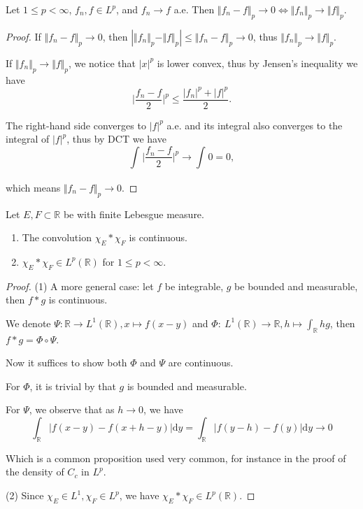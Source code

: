 \begin{problem}
Let $ 1\le p<\infty $, $ f_{n},f\in L^{p} $, and $ f_{n}\to f $ a.e. Then $ \Vert f_{n}-f \Vert_{p}\to 0 \Leftrightarrow \Vert f_{n} \Vert_{p}\to \Vert f \Vert_{p} $.
\end{problem}

\begin{proof}
	If $ \Vert f_{n}-f \Vert_{p}\to 0 $, then $ |\Vert f_{n} \Vert_{p}-\Vert f \Vert_{p}|\le \Vert f_{n}-f \Vert_{p}\to 0 $, thus $ \Vert f_{n} \Vert_{p}\to \Vert f \Vert_{p} $.
	
	If $ \Vert f_{n} \Vert_{p}\to \Vert f \Vert_{p} $, we notice that $ |x|^{p} $ is lower convex, thus by Jensen's inequality we have
	$$
	\Big|\frac{f_n-f}{2}\Big|^p\le \frac{|f_n|^p+|f|^p}{2}.
	$$
	
	The right-hand side converges to $ |f|^{p} $ a.e. and its integral also converges to the integral of $ |f|^{p} $, thus by DCT we have
	$$
	\int_{}^{}{\Big|\frac{f_n-f}{2}\Big|^p}\rightarrow \int_{}^{}{0}=0,
	$$
	
	which means $ \Vert f_{n}-f \Vert_{p}\to 0 $.
\end{proof}

\begin{problem}
Let $ E,F\subset \mathbb{R}  $ be with finite Lebesgue measure.
\begin{enumerate}
\item The convolution $ \chi _{E}*\chi _{F} $ is continuous.
\item $ \chi _{E}*\chi _{F}\in L^{p}(\mathbb{R} ) $ for $ 1\le p<\infty $.
\end{enumerate}
\end{problem}

\begin{proof}
	(1) A more general case: let $ f $ be integrable, $ g $ be bounded and measurable, then $ f*g $ is continuous.
	
	We denote $
	\varPsi \colon \mathbb{R}\rightarrow L^1( \mathbb{R} ) ,x\mapsto f( x-y ) 
	$ and $
	\varPhi \colon\ L^1( \mathbb{R} ) \rightarrow \mathbb{R},h\mapsto \int_{\mathbb{R}}^{}{hg}
	$, then $ f*g=\varPhi \circ \varPsi $.
	
	Now it suffices to show both $ \varPhi $ and $ \varPsi $ are continuous.
	
	For $ \varPhi $, it is trivial by that $ g $ is bounded and measurable.
	
	For $ \varPsi $, we observe that as $ h\to 0 $, we have
	$$
	\int_{\mathbb{R}}^{}{|f( x-y ) -f( x+h-y ) |\mathrm{d} y}=\int_{\mathbb{R}}^{}{|f( y-h ) -f( y ) |\mathrm{d} y}\rightarrow 0
	$$
	
	Which is a common proposition used very common, for instance in the proof of the density of $ C_{c}$ in $ L^{p} $.
	
	(2) Since $ \chi _{E}\in L^{1},\chi _{F}\in L^{p} $, we have $ \chi _{E}*\chi _{F}\in L^{p}(\mathbb{R} ) $.
\end{proof}


